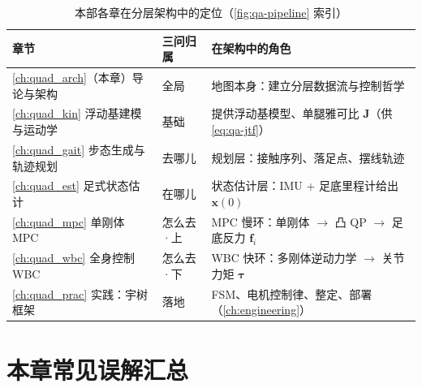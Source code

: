 \begin{table}[H]\centering\small
\caption{本部各章在分层架构中的定位（\cref{fig:qa-pipeline} 索引）}
\begin{tabular}{p{} p{} p{}}
\toprule
章节 & 三问归属 & 在架构中的角色 \\
\midrule
\cref{ch:quad_arch}（本章）导论与架构 & 全局 & 地图本身：建立分层数据流与控制哲学 \\
\cref{ch:quad_kin} 浮动基建模与运动学 & 基础 & 提供浮动基模型、单腿雅可比 $\mathbf{J}$（供 \cref{eq:qa-jtf}）\\
\cref{ch:quad_gait} 步态生成与轨迹规划 & 去哪儿 & 规划层：接触序列、落足点、摆线轨迹 \\
\cref{ch:quad_est} 足式状态估计 & 在哪儿 & 状态估计层：IMU + 足底里程计给出 $\boldsymbol x(0)$ \\
\cref{ch:quad_mpc} 单刚体 MPC & 怎么去·上 & MPC 慢环：单刚体 $\to$ 凸 QP $\to$ 足底反力 $\mathbf{f}_i$ \\
\cref{ch:quad_wbc} 全身控制 WBC & 怎么去·下 & WBC 快环：多刚体逆动力学 $\to$ 关节力矩 $\boldsymbol\tau$ \\
\cref{ch:quad_prac} 实践：宇树框架 & 落地 & FSM、电机控制律、整定、部署（\cref{ch:engineering}）\\
\bottomrule
\end{tabular}
\label{tab:qa-chapter-map}
\end{table}

\section*{本章常见误解汇总}

